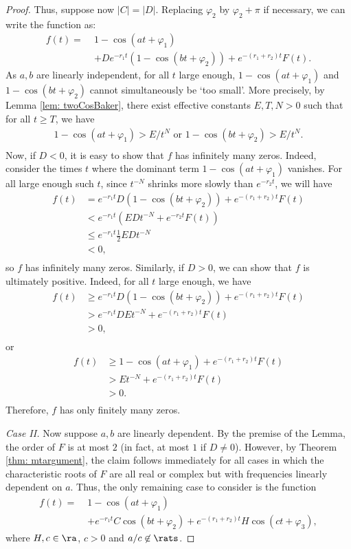 \begin{proof}
Thus, suppose now $|C|=|D|$. Replacing $\varphi_2$ by $\varphi_2+\pi$ 
if necessary, we can write the function as:
\begin{align*}
f(t) = \; & 1-\cos(at + \varphi_1) \\
& + De^{-r_1t}(1-\cos(bt+\varphi_2)) + e^{-(r_1+r_2)t}F(t).
\end{align*}
As $a,b$ are linearly independent, 
for all $t$ large enough, $1-\cos(at+\varphi_1)$ and $1-\cos(bt+\varphi_2)$
cannot simultaneously be `too small'. More precisely, by Lemma \ref{lem: twoCosBaker}, 
there exist effective constants $E, T, N>0$ such that for all $t\geq T$,
we have
\begin{align*}
1-\cos(at+\varphi_1) > E / t^N \mbox{ or }  
1-\cos(bt + \varphi_2) > E / t^N. \\
\end{align*}
Now, if $D<0$, it is easy
to show that $f$ has infinitely many zeros. Indeed, consider the
times $t$ where the dominant term $1-\cos(at + \varphi_1)$
vanishes. For all large enough such $t$, since $t^{-N}$ shrinks more 
slowly than $e^{-r_2t}$, we will have 
\begin{align*}
f(t) & = e^{-r_1t}D(1-\cos(bt + \varphi_2)) + e^{-(r_1+r_2)t}F(t)  \\
& < e^{-r_1t}( EDt^{-N} + e^{-r_2t}F(t) )  \\
& \leq e^{-r_1t}\frac{1}{2}EDt^{-N} \\
& < 0, \\
\end{align*}
so $f$ has infinitely many zeros.
Similarly, if $D>0$, we can show that $f$ is
ultimately positive.  Indeed, for all $t$ large enough, 
we have
\begin{align*}
f(t) & \geq e^{-r_1t}D(1-\cos(bt+\varphi_2)) + e^{-(r_1+r_2)t}F(t) \\
& > e^{-r_1t}DE t^{-N} + e^{-(r_1+r_2)t}F(t) \\
& > 0, \\
\end{align*}
or
\begin{align*}
f(t) & \geq 1-\cos(at+\varphi_1) + e^{-(r_1+r_2)t}F(t) \\
& > E t^{-N} + e^{-(r_1+r_2)t}F(t) \\
& > 0. \\
\end{align*}
Therefore, $f$ has only finitely many zeros.


\emph{Case II.} Now suppose $a,b$ are linearly dependent. By the premise of
the Lemma, the order of $F$ is at most $2$ (in fact, 
at most $1$ if $D\neq 0$). However, by Theorem \ref{thm: mtargument}, the claim follows immediately
for all cases in which the characteristic roots of $F$ are all real
or complex but with frequencies linearly dependent on $a$. Thus, the only remaining
case to consider is the function
\begin{align*} 
f(t) = \; & 1-\cos(at+\varphi_1) \\
& + e^{-r_1t}C\cos(bt+\varphi_2) + e^{-(r_1+r_2)t}H\cos(ct+\varphi_3), 
\end{align*}
where $H,c\in\ra$, $c > 0$ and $a/c\not\in\rats$.


\end{proof}
